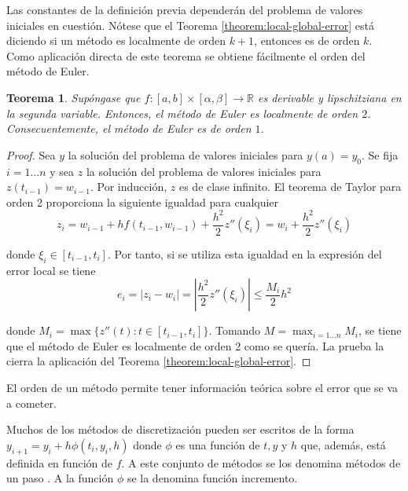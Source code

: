 \documentclass{article}
\theoremstyle{theorem-style}  %
\newtheorem{theorem}{Teorema}[section]  %
\theoremstyle{definition-style}
\theoremstyle{example-style}
\begin{document}
	Las constantes de la definición previa dependerán del problema de valores iniciales en cuestión. Nótese que el Teorema \ref{theorem:local-global-error} está diciendo si un método es localmente de orden $k+1$, entonces es de orden $k$. Como aplicación directa de este teorema se obtiene fácilmente el orden del método de Euler.

	\begin{theorem} \label{theorem:euler:error}
		Supóngase que $f: [a,b] \times [\alpha, \beta] \rightarrow \mathbb{R}$ es derivable y lipschitziana en la segunda variable. Entonces, el método de Euler es localmente de orden $2$. Consecuentemente, el método de Euler es de orden $1$.
	\end{theorem}

	\begin{proof}
		Sea $y$ la solución del problema de valores iniciales para $y(a) = y_0$. Se fija $i = 1 \ldots n$ y sea $z$ la solución del problema de valores iniciales para $z(t_{i-1}) = w_{i-1}$. Por inducción, $z$ es de clase infinito. El teorema de Taylor para orden 2 proporciona la siguiente igualdad para cualquier
		\begin{equation}
			z_i= w_{i-1} + h f(t_{i-1}, w_{i-1}) + \frac{h^2}{2} z''(\xi_i) = w_i + \frac{h^2}{2} z''(\xi_i)
		\end{equation}

		donde $\xi_i \in [t_{i-1}, t_i]$. Por tanto, si se utiliza esta igualdad en la expresión del error local se tiene
		\begin{equation}
			e_i = |z_i - w_i| = \left|\frac{h^2}{2} z''(\xi_i)\right| \le \frac{M_i}{2} h^2
		\end{equation}

		donde $M_i = \max\{z''(t) : t \in [t_{i-1}, t_i]\}$. Tomando $M = \max_{i = 1 \ldots n} M_i$, se tiene que el método de Euler es localmente de orden 2 como se quería. La prueba la cierra la aplicación del Teorema \ref{theorem:local-global-error}.
	\end{proof}

	El orden de un método permite tener información teórica sobre el error que se va a cometer.

    Muchos de los métodos de discretización pueden ser escritos de la forma $y_{i+1}=y_i + h \phi(t_i,y_i,h)$ donde $\phi$ es una función de $t, y$ y $h$ que, además, está definida en función de $f$. A este conjunto de métodos se los denomina métodos de un paso \cite{gear}. A la función $\phi$ se la denomina función incremento.
\end{document}
